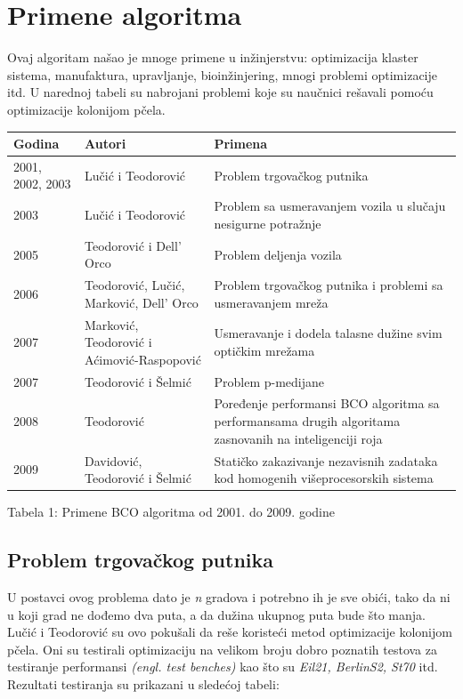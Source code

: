 \documentclass[a4paper]{article}
\begin{document}
{\section{Primene algoritma}
Ovaj algoritam našao je mnoge primene u inžinjerstvu: optimizacija klaster sistema, manufaktura, upravljanje, bioinžinjering, mnogi problemi optimizacije itd.
U narednoj tabeli su nabrojani problemi koje su naučnici rešavali pomoću optimizacije kolonijom pčela.

\begin{center}
\begin{tabular}{|p{1cm}|p{3cm}|p{5cm}|}
 \hline
Godina & Autori & Primena \\ \hline
2001, 2002, 2003&Lučić i Teodorović&Problem trgovačkog putnika\\ \hline
2003&Lučić i Teodorović&Problem sa usmeravanjem vozila u slučaju nesigurne potražnje\\ \hline
2005&Teodorović i Dell’ Orco&Problem deljenja vozila\\ \hline
2006&Teodorović, Lučić, Marković, Dell’ Orco & Problem trgovačkog putnika i problemi sa usmeravanjem mreža\\ \hline
2007&Marković, Teodorović i Aćimović-Raspopović & Usmeravanje i dodela talasne dužine svim optičkim mrežama\\ \hline
2007& Teodorović i Šelmić & Problem p-medijane\\ \hline
2008& Teodorović & Poređenje performansi BCO algoritma sa performansama drugih algoritama zasnovanih na inteligenciji roja\\ \hline
2009& Davidović, Teodorović i Šelmić & Statičko zakazivanje nezavisnih zadataka kod homogenih višeprocesorskih sistema\\ \hline
\end{tabular}\par
\bigskip
Tabela 1: Primene BCO algoritma od 2001. do 2009. godine
\end{center}

\subsection{Problem trgovačkog putnika}
\label{subsec:prvaprimena}
U postavci ovog problema dato je {\em n} gradova i potrebno ih je sve obići, tako da ni u koji grad ne dođemo dva puta, a da dužina ukupnog puta bude što manja. Lučić i Teodorović su ovo pokušali da reše koristeći metod optimizacije kolonijom pčela. Oni su testirali optimizaciju na velikom broju dobro poznatih testova za testiranje performansi {\em (engl. test benches)} kao što su {\em Eil21, BerlinS2, St70} itd\cite{test}. Rezultati testiranja su prikazani u sledećoj tabeli: 

}
\end{document}
